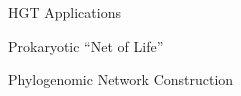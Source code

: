 \documentclass[dvipsnames]{beamer}
\begin{document}
\begin{frame}[fragile]{HGT Applications}
    \begin{figure}[htb!]
        \autocite{argspread}
    \end{figure}
\end{frame}
\begin{frame}[fragile]{Prokaryotic ``Net of Life''}
    \begin{figure}[htb!]
        \autocite{netoflife}
    \end{figure}
\end{frame}
\begin{frame}[fragile]{Phylogenomic Network Construction}
    \begin{figure}[htb!]
        \autocite{ihgt}
    \end{figure}
\end{frame}
\end{document}
